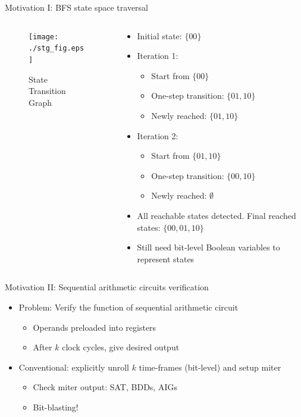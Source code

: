 \documentclass[xcolor=dvipsnames]{beamer}
\newcommand{\bi}{\begin{itemize}}
\newcommand{\ei}{\end{itemize}}
\begin{document}
\begin{frame}[label = linkSTG]{\large{Motivation I: BFS state space traversal}}
\begin{columns}[onlytextwidth]
\begin{column}{0.5\textwidth}
\begin{figure}
\centering
\texttt{[image: ./stg\_fig.eps]}
\caption{State Transition Graph}
\end{figure}
\end{column}
\begin{column}{0.5\textwidth}
\bi
\item Initial state: $\{00\}$
\item Iteration 1: 
	\bi
	\item Start from $\{00\}$
	\item One-step transition: $\{01,10\}$
	\item Newly reached: $\{01,10\}$
	\ei
\item Iteration 2: 
	\bi
	\item Start from $\{01,10\}$
	\item One-step transition: $\{00,10\}$
	\item Newly reached: $\emptyset$
	\ei
\item All reachable states detected. Final reached states: $\{00,01,10\}$
\pause
\item Still need bit-level Boolean variables to represent states
\ei
\end{column}
\end{columns}
\hyperlink{pptpage2}{}
\end{frame}
\begin{frame}[label = motiv2]{\large{Motivation II: Sequential arithmetic circuits verification}}
\vspace{-0.1in}
\begin{figure}[H]
\end{figure}
\vspace{-0.2in}
\bi
\item Problem: Verify the function of sequential arithmetic circuit
	\bi
	\item Operands preloaded into registers
	\item After $k$ clock cycles, give desired output
	\ei
\item Conventional: explicitly unroll $k$ time-frames (bit-level) and setup miter
	\bi
	\item Check miter output: SAT, BDDs, AIGs
	\item Bit-blasting!
	\ei
\ei
\hyperlink{Moore}{}
\end{frame}
\end{document}
